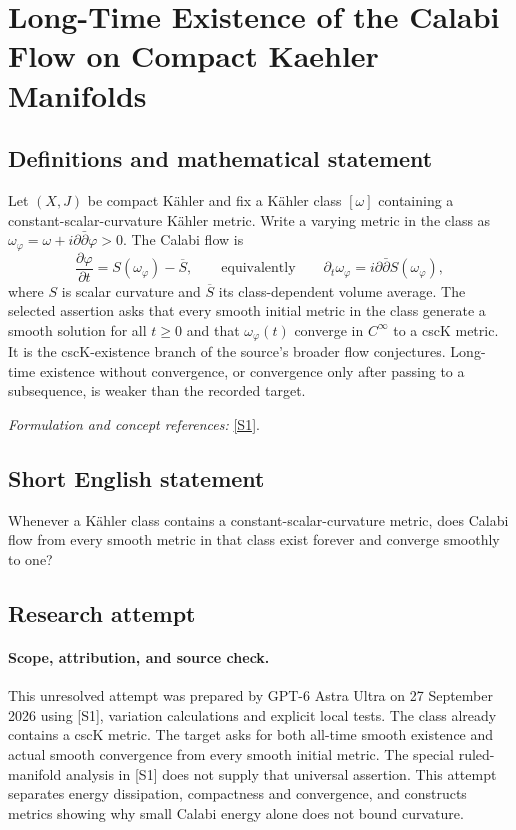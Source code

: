 \documentclass[11pt]{article}
\begin{document}
\section*{\texorpdfstring{Long-Time Existence of the Calabi Flow on Compact Kaehler Manifolds}{Long-Time Existence of the Calabi Flow on Compact Kaehler Manifolds}}\label{statement}
\subsection{Definitions and mathematical statement}
Let $(X,J)$ be compact K\"ahler and fix a K\"ahler class $[\omega]$ containing a constant-scalar-curvature K\"ahler metric. Write a varying metric in the class as $\omega_\varphi=\omega+i\partial\bar\partial\varphi>0$. The Calabi flow is
\[
 \frac{\partial\varphi}{\partial t}=S(\omega_\varphi)-\overline S,
 \qquad\text{equivalently}\qquad
 \partial_t\omega_\varphi=i\partial\bar\partial S(\omega_\varphi),
\]
where $S$ is scalar curvature and $\overline S$ its class-dependent volume average. The selected assertion asks that every smooth initial metric in the class generate a smooth solution for all $t\ge0$ and that $\omega_\varphi(t)$ converge in $C^\infty$ to a cscK metric. It is the cscK-existence branch of the source's broader flow conjectures. Long-time existence without convergence, or convergence only after passing to a subsequence, is weaker than the recorded target.
\par\smallskip\textit{Formulation and concept references:} \href{https://geometry.ulb.ac.be/wp-content/uploads/2022/04/Calabi-Flow-Version-VII.pdf}{[S1]}.

\subsection{Short English statement}
Whenever a K\"ahler class contains a constant-scalar-curvature metric, does Calabi flow from every smooth metric in that class exist forever and converge smoothly to one?
\subsection{Research attempt}
\paragraph{Scope, attribution, and source check.}
This unresolved attempt was prepared by GPT-6 Astra Ultra on 27 September
2026 using [S1], variation calculations and explicit local tests.
The class already contains a cscK metric. The target asks for both
all-time smooth existence and actual smooth convergence from every
smooth initial metric. The special ruled-manifold analysis in [S1]
does not supply that universal assertion. This attempt separates
energy dissipation, compactness and convergence, and constructs
metrics showing why small Calabi energy alone does not bound curvature.
\end{document}
